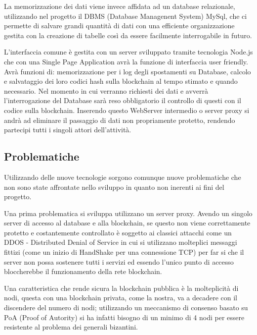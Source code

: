 \documentclass[11pt,a4paper,titlepage, twoside, openright]{report}
\begin{document}
La memorizzazione dei dati viene invece affidata ad un database relazionale, utilizzando nel progetto il DBMS (Database Managenent System) MySql, che ci permette di salvare grandi quantità di dati con una efficiente organizzazione gestita con la creazione di tabelle così da essere facilmente interrogabile in futuro.
 
L'interfaccia comune è gestita con un server sviluppato tramite tecnologia Node.js che con una Single Page Application avrà la funzione di interfaccia user friendly. Avrà funzioni di: memorizzazione per i log degli spostamenti su Database, calcolo e salvataggio dei loro codici hash sulla blockchain al tempo stimato e quando necessario. Nel momento in cui verranno richiesti dei dati e avverrà l'interrogazione del Database sarà reso obbligatorio il controllo di questi con il codice sulla blockchain. Inserendo questo WebServer intermedio o server proxy si andrà ad eliminare il passaggio di dati non propriamente protetto, rendendo partecipi tutti i singoli attori dell'attività.

\subsection{Problematiche}
Utilizzando delle nuove tecnologie sorgono comunque nuove problematiche che non sono state affrontate nello sviluppo in quanto non inerenti ai fini del progetto.

Una prima problematica si sviluppa utilizzano un server proxy. Avendo un singolo server di accesso al database e alla blockchain, se questo non viene correttamente protetto e costantemente controllato è soggetto ai classici attacchi come un DDOS - Distributed Denial of Service in cui si utilizzano molteplici messaggi fittizi (come un inizio di HandShake per una connessione TCP) per far si che il server non possa sostenere tutti i servizi ed essendo l'unico punto di accesso bloccherebbe il funzionamento della rete blockchain.

Una caratteristica che rende sicura la blockchain pubblica è la molteplicità di nodi, questa con una blockchain privata, come la nostra, va a decadere con il discendere  del numero di nodi; utilizzando un meccanismo di consenso basato su PoA (Proof of Autority) si ha infatti bisogno di un minimo di 4 nodi per essere resistente al problema dei generali bizantini.
\end{document}
